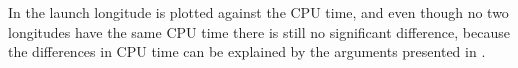 \noindent
In  the launch longitude is plotted against the CPU time, and even though no two longitudes have the same CPU time there is still no significant difference, because the differences in CPU time can be explained by the arguments presented in . 


%
%




